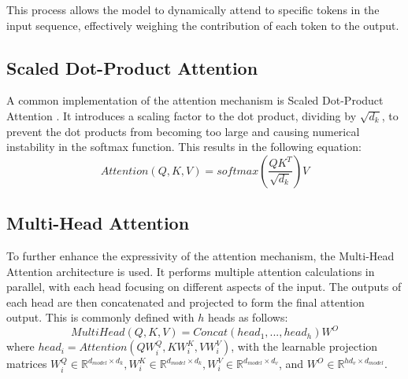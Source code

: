 \documentclass[12pt,a4paper]{report}
\begin{document}
This process allows the model to dynamically attend to specific tokens in the input sequence, effectively weighing the contribution of each token to the output.

\subsection{Scaled Dot-Product Attention}
A common implementation of the attention mechanism is Scaled Dot-Product Attention \cite{transformers}. It introduces a scaling factor to the dot product, dividing by $\sqrt{d_k}$, to prevent the dot products from becoming too large and causing numerical instability in the softmax function. This results in the following equation:
\[Attention(Q,K,V) = softmax( \frac{QK^T}{\sqrt{d_k}} )V\]

\subsection{Multi-Head Attention}
To further enhance the expressivity of the attention mechanism, the Multi-Head Attention \cite{transformers} architecture is used. It performs multiple attention calculations in parallel, with each head focusing on different aspects of the input. The outputs of each head are then concatenated and projected to form the final attention output. This is commonly defined with $h$ heads as follows:
\[MultiHead(Q,K,V) = Concat(head_1, ..., head_h)W^O\]
where $head_i = Attention(QW^Q_i, KW^K_i, VW^V_i)$, with the learnable projection matrices $W^Q_i \in \mathbb{R}^{d_{model} \times d_k}, W^K_i \in \mathbb{R}^{d_{model} \times d_k}, W^V_i \in \mathbb{R}^{d_{model} \times d_v}$, and $W^O \in \mathbb{R}^{hd_v \times d_{model}}$.
\end{document}
